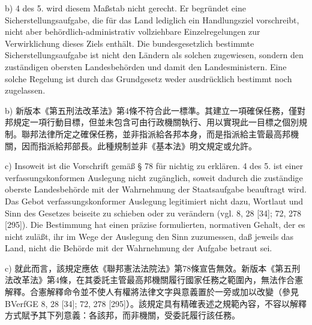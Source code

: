 \documentclass[12pt]{article}
\begin{document}
\begin{sourcepara}[title={原文E.254}]
b) \abbrArt{} 4 des 5. \abbrStrRG{} \abbrNF{} wird diesem Maßstab nicht gerecht. Er begründet eine Sicherstellungsaufgabe, die für das Land lediglich ein Handlungsziel vorschreibt, nicht aber behördlich-administrativ vollziehbare Einzelregelungen zur Verwirklichung dieses Ziels enthält. Die bundesgesetzlich bestimmte Sicherstellungsaufgabe ist nicht den Ländern als solchen zugewiesen, sondern den zuständigen obersten Landesbehörden und damit den Landesministern. Eine solche Regelung ist durch das Grundgesetz weder ausdrücklich bestimmt noch zugelassen.
\end{sourcepara}
\begin{transpara}
b) 新版本《第五刑法改革法》第4條不符合此一標準。其建立一項確保任務，僅對邦規定一項行動目標，但並未包含可由行政機關執行、用以實現此一目標之個別規制。聯邦法律所定之確保任務，並非指派給各邦本身，而是指派給主管最高邦機關，因而指派給邦部長。此種規制並非《基本法》明文規定或允許。
\end{transpara}

\begin{sourcepara}[title={原文E.255}]
c) Insoweit ist die Vorschrift gemäß § 78 \abbrBVerfGG{} für nichtig zu erklären. \abbrArt{} 4 des 5. \abbrStrRG{} \abbrNF{} ist einer verfassungskonformen Auslegung nicht zugänglich, soweit dadurch die zuständige oberste Landesbehörde mit der Wahrnehmung der Staatsaufgabe beauftragt wird. Das Gebot verfassungskonformer Auslegung legitimiert nicht dazu, Wortlaut und Sinn des Gesetzes beiseite zu schieben oder zu verändern (vgl. \abbrBVerfGE{} 8, 28 [34]; 72, 278 [295]). Die Bestimmung hat einen präzise formulierten, normativen Gehalt, der es nicht zuläßt, ihr im Wege der Auslegung den Sinn zuzumessen, daß jeweils das Land, nicht die Behörde mit der Wahrnehmung der Aufgabe betraut sei.
\end{sourcepara}
\begin{transpara}
c) 就此而言，該規定應依《聯邦憲法法院法》第78條宣告無效。新版本《第五刑法改革法》第4條，在其委託主管最高邦機關履行國家任務之範圍內，無法作合憲解釋。合憲解釋命令並不使人有權將法律文字與意義置於一旁或加以改變（參見 BVerfGE 8, 28 [34]; 72, 278 [295]）。該規定具有精確表述之規範內容，不容以解釋方式賦予其下列意義：各該邦，而非機關，受委託履行該任務。
\end{transpara}
\end{document}
